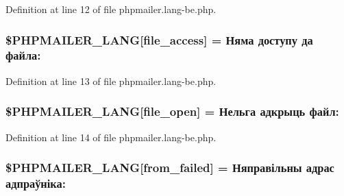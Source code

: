 Definition at line 12 of file phpmailer.\+lang-\/be.\+php.

\subsubsection[{\texorpdfstring{\$\+P\+H\+P\+M\+A\+I\+L\+E\+R\+\_\+\+L\+A\+NG}{$PHPMAILER_LANG}}]{\setlength{\rightskip}{0pt plus 5cm}\$P\+H\+P\+M\+A\+I\+L\+E\+R\+\_\+\+L\+A\+NG\mbox{[}\textquotesingle{}file\+\_\+access\textquotesingle{}\mbox{]} = \textquotesingle{}Няма доступу да файла\+: \textquotesingle{}}\hypertarget{phpmailer_8lang-be_8php_a7e83349023b856ef9e5c46e30ae6d51e}{}\label{phpmailer_8lang-be_8php_a7e83349023b856ef9e5c46e30ae6d51e}


Definition at line 13 of file phpmailer.\+lang-\/be.\+php.

\subsubsection[{\texorpdfstring{\$\+P\+H\+P\+M\+A\+I\+L\+E\+R\+\_\+\+L\+A\+NG}{$PHPMAILER_LANG}}]{\setlength{\rightskip}{0pt plus 5cm}\$P\+H\+P\+M\+A\+I\+L\+E\+R\+\_\+\+L\+A\+NG\mbox{[}\textquotesingle{}file\+\_\+open\textquotesingle{}\mbox{]} = \textquotesingle{}Нельга адкрыць файл\+: \textquotesingle{}}\hypertarget{phpmailer_8lang-be_8php_a28d1a6517bf4c942a0ddd506188ad2e0}{}\label{phpmailer_8lang-be_8php_a28d1a6517bf4c942a0ddd506188ad2e0}


Definition at line 14 of file phpmailer.\+lang-\/be.\+php.

\subsubsection[{\texorpdfstring{\$\+P\+H\+P\+M\+A\+I\+L\+E\+R\+\_\+\+L\+A\+NG}{$PHPMAILER_LANG}}]{\setlength{\rightskip}{0pt plus 5cm}\$P\+H\+P\+M\+A\+I\+L\+E\+R\+\_\+\+L\+A\+NG\mbox{[}\textquotesingle{}from\+\_\+failed\textquotesingle{}\mbox{]} = \textquotesingle{}Няправільны адрас адпраўніка\+: \textquotesingle{}}\hypertarget{phpmailer_8lang-be_8php_adf832ae12155a09be077c6d5e4fd7e22}{}\label{phpmailer_8lang-be_8php_adf832ae12155a09be077c6d5e4fd7e22}


